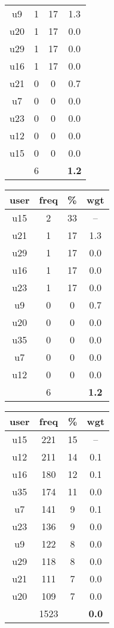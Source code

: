 \begin{table}
\begin{tabular}{ |c|c|c|c| }
	u9 & 1 & 17 & 1.3 \\
	u20 & 1 & 17 & 0.0 \\
	u29 & 1 & 17 & 0.0 \\
	u16 & 1 & 17 & 0.0 \\
	u21 & 0 & 0 & 0.7 \\
	u7 & 0 & 0 & 0.0 \\
	u23 & 0 & 0 & 0.0 \\
	u12 & 0 & 0 & 0.0 \\
	u15 & 0 & 0 & 0.0 \\
	 & 6 & & \textbf{1.2} \\
	\hline
\end{tabular}
\begin{tabular}{ |c|c|c|c| }
	\hline
	\textbf{user} & \textbf{freq} & \textbf{\%} & \textbf{wgt} \\
	\hline
	u15 & 2 & 33 & -- \\
	u21 & 1 & 17 & 1.3 \\
	u29 & 1 & 17 & 0.0 \\
	u16 & 1 & 17 & 0.0 \\
	u23 & 1 & 17 & 0.0 \\
	u9 & 0 & 0 & 0.7 \\
	u20 & 0 & 0 & 0.0 \\
	u35 & 0 & 0 & 0.0 \\
	u7 & 0 & 0 & 0.0 \\
	u12 & 0 & 0 & 0.0 \\
	 & 6 & & \textbf{1.2} \\
	\hline
\end{tabular}
\begin{tabular}{ |c|c|c|c| }
	\hline
	\textbf{user} & \textbf{freq} & \textbf{\%} & \textbf{wgt} \\
	\hline
	u15 & 221 & 15 & -- \\
	u12 & 211 & 14 & 0.1 \\
	u16 & 180 & 12 & 0.1 \\
	u35 & 174 & 11 & 0.0 \\
	u7 & 141 & 9 & 0.1 \\
	u23 & 136 & 9 & 0.0 \\
	u9 & 122 & 8 & 0.0 \\
	u29 & 118 & 8 & 0.0 \\
	u21 & 111 & 7 & 0.0 \\
	u20 & 109 & 7 & 0.0 \\
	 & 1523 & & \textbf{0.0} \\

\end{tabular}
\end{table}
